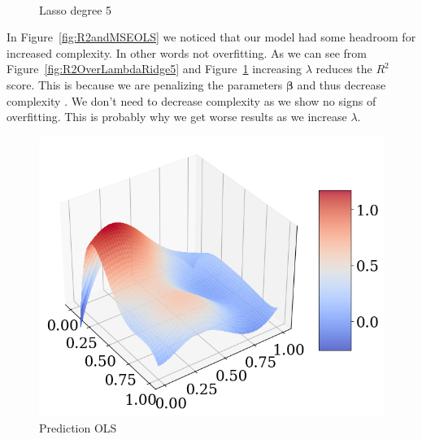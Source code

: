 \documentclass[twoside,11pt]{report}
\begin{document}
\begin{figure}[!h]
\begin{minipage}[!t]{.48\linewidth}
\begin{center}
        \caption{Lasso degree 5}\label{fig:R2OverLambdaLasso5}
    \end{center}
\end{minipage}\\
\end{figure}
In Figure~\ref{fig:R2andMSEOLS} we noticed that our model had some headroom for increased complexity. In
other words not overfitting. As we can see from Figure~\ref{fig:R2OverLambdaRidge5} and Figure~\ref{fig:R2OverLambdaLasso5}
increasing $\lambda$ reduces the $R^2$ score. This is because we are penalizing the parameters $\boldsymbol{\beta}$ and thus
decrease complexity . We don't need to decrease complexity as we show no signs of overfitting. 
This is probably why we get worse results as we increase $\lambda$.

\begin{figure}[h]
\begin{minipage}[t]{.48\linewidth}
    \begin{center}
        \includegraphics[width=1.0\textwidth]{../runsAndAdditions/predictionOLS.png}
        \caption{Prediction OLS}\label{fig:predictionOLS}
\end{center}
\end{minipage}
\hspace{4mm}
\begin{minipage}[t]{.48\linewidth}
    \begin{center}

\end{center}
\end{minipage}
\end{figure}
\end{document}
